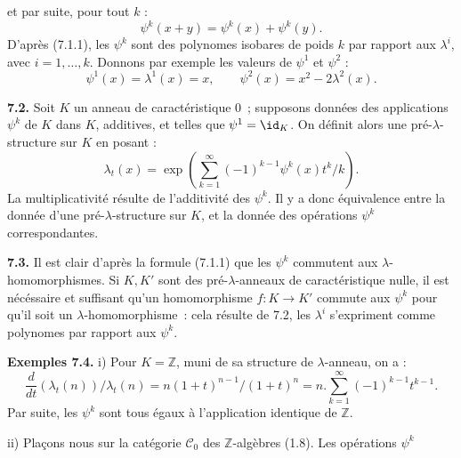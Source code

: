 et par
suite, pour tout \(k\) :
\[
  \psi^k(x+y)=\psi^k(x)+\psi^k(y).
\]
D'après (7.1.1), les \(\psi^k\) sont des polynomes isobares de poids \(k\) par rapport aux \(\lambda^i\), avec \(i=1,\ldots,k\). Donnons par exemple les valeurs de \(\psi^1\) et \(\psi^2\) :
\[
  \psi^1(x)=\lambda^1(x)=x,
  \qquad
  \psi^2(x)=x^2-2\lambda^2(x).
\]

\textbf{7.2.} Soit \(K\) un anneau de caractéristique \(0\)~; supposons données des applications \(\psi^k\) de \(K\) dans \(K\), additives, et telles que \(\psi^1=\id_K\). On définit alors une pré-\(\lambda\)-structure sur \(K\) en posant :
\begin{equation}\tag{7.2.1}
  \lambda_t(x)=
  \exp\left(\sum_{k=1}^{\infty}(-1)^{k-1}\psi^k(x)t^k/k\right).
\end{equation}
La multiplicativité résulte de l'additivité des \(\psi^k\). Il y a donc équivalence entre la donnée d'une pré-\(\lambda\)-structure sur \(K\), et la donnée des opérations \(\psi^k\) correspondantes.

\textbf{7.3.} Il est clair d'après la formule (7.1.1) que les \(\psi^k\) commutent aux \(\lambda\)-homomorphismes. Si \(K,K'\) sont des pré-\(\lambda\)-anneaux de caractéristique nulle, il est nécéssaire et suffisant qu'un homomorphisme \(f:K\to K'\) commute aux \(\psi^k\) pour qu'il soit un \(\lambda\)-homomorphisme~: cela résulte de 7.2, les \(\lambda^i\) s'expriment comme polynomes par rapport aux \(\psi^k\).

\textbf{Exemples 7.4.} i) Pour \(K=\mathbb Z\), muni de sa structure de \(\lambda\)-anneau, on a :
\[
  \frac{d}{dt}(\lambda_t(n))/\lambda_t(n)
  =
  n(1+t)^{n-1}/(1+t)^n
  =
  n.\sum_{k=1}^{\infty}(-1)^{k-1}t^{k-1}.
\]
Par suite, les \(\psi^k\) sont tous égaux à l'application identique de \(\mathbb Z\).

ii) Plaçons nous sur la catégorie \(\mathcal C_0\) des \(\mathbb Z\)-algèbres (1.8). Les opérations \(\psi^k\)
